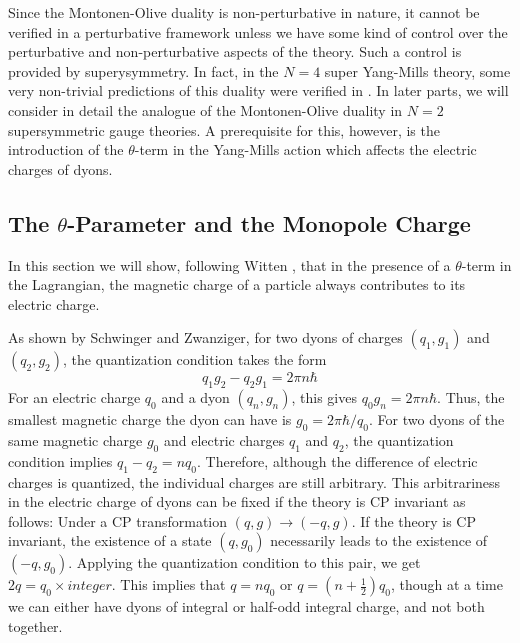 Since the Montonen-Olive duality is non-perturbative in nature, it
cannot be verified in a perturbative framework unless we have some
kind of control over the perturbative and non-perturbative aspects of
the theory. Such a control is provided by superysymmetry. In fact, in 
the $N=4$ super Yang-Mills theory, some very non-trivial predictions
of this duality were verified in \cite{sen}. In later parts, we will
consider in detail the analogue of the Montonen-Olive duality in $N=2$
supersymmetric gauge theories. A prerequisite for this, however, is
the introduction of the $\theta$-term in the Yang-Mills action which
affects the electric charges of dyons.    

\subsection{The $\theta$-Parameter and the Monopole Charge}

In this section we will show, following Witten \cite{Witten79}, that
in the presence of a $\theta$-term in the Lagrangian, the magnetic
charge of a particle always contributes to its electric charge.

As shown by Schwinger and Zwanziger, for two dyons of charges
$(q_1,g_1)$ and $(q_2,g_2)$, the quantization condition takes the form
\begin{equation}
q_1g_2 - q_2g_1 = 2 \pi n \hbar
\label{LXXVI}
\end{equation}
For an electric charge $q_0$ and a dyon $(q_n,g_n)$, this gives
$q_0g_n = 2\pi n\hbar$. Thus, the smallest magnetic charge the dyon
can have is $g_0=2\pi\hbar/q_0$. For two dyons of the same magnetic
charge $g_0$ and electric charges $q_1$ and $q_2$, the quantization
condition implies $q_1-q_2= nq_0$. Therefore, although the difference
of electric charges is quantized, the individual charges are still
arbitrary. This arbitrariness in the electric charge of dyons can be
fixed if the theory is CP invariant as follows: Under a CP
transformation $(q,g)\rightarrow (-q,g)$. If the theory is CP
invariant, the existence of a state $(q,g_0)$ necessarily leads to the
existence of $(-q,g_0)$. Applying the quantization condition to this
pair, we get $2q =q_0\times integer$. This implies that $q=nq_0$ or
$q=(n+\frac{1}{2})q_0$, though at a time we can either have dyons of
integral or half-odd integral charge, and not both together.

